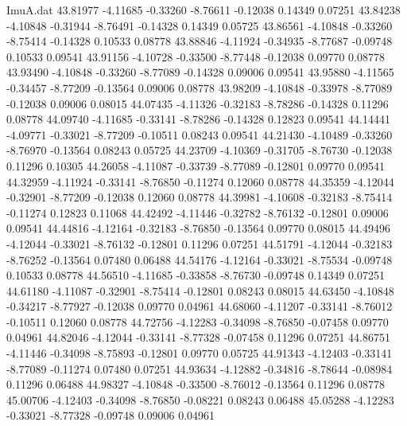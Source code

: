 \begin{filecontents}{ImuA.dat}
  43.81977   -4.11685   -0.33260   -8.76611   -0.12038    0.14349    0.07251
  43.84238   -4.10848   -0.31944   -8.76491   -0.14328    0.14349    0.05725
  43.86561   -4.10848   -0.33260   -8.75414   -0.14328    0.10533    0.08778
  43.88846   -4.11924   -0.34935   -8.77687   -0.09748    0.10533    0.09541
  43.91156   -4.10728   -0.33500   -8.77448   -0.12038    0.09770    0.08778
  43.93490   -4.10848   -0.33260   -8.77089   -0.14328    0.09006    0.09541
  43.95880   -4.11565   -0.34457   -8.77209   -0.13564    0.09006    0.08778
  43.98209   -4.10848   -0.33978   -8.77089   -0.12038    0.09006    0.08015
  44.07435   -4.11326   -0.32183   -8.78286   -0.14328    0.11296    0.08778
  44.09740   -4.11685   -0.33141   -8.78286   -0.14328    0.12823    0.09541
  44.14441   -4.09771   -0.33021   -8.77209   -0.10511    0.08243    0.09541
  44.21430   -4.10489   -0.33260   -8.76970   -0.13564    0.08243    0.05725
  44.23709   -4.10369   -0.31705   -8.76730   -0.12038    0.11296    0.10305
  44.26058   -4.11087   -0.33739   -8.77089   -0.12801    0.09770    0.09541
  44.32959   -4.11924   -0.33141   -8.76850   -0.11274    0.12060    0.08778
  44.35359   -4.12044   -0.32901   -8.77209   -0.12038    0.12060    0.08778
  44.39981   -4.10608   -0.32183   -8.75414   -0.11274    0.12823    0.11068
  44.42492   -4.11446   -0.32782   -8.76132   -0.12801    0.09006    0.09541
  44.44816   -4.12164   -0.32183   -8.76850   -0.13564    0.09770    0.08015
  44.49496   -4.12044   -0.33021   -8.76132   -0.12801    0.11296    0.07251
  44.51791   -4.12044   -0.32183   -8.76252   -0.13564    0.07480    0.06488
  44.54176   -4.12164   -0.33021   -8.75534   -0.09748    0.10533    0.08778
  44.56510   -4.11685   -0.33858   -8.76730   -0.09748    0.14349    0.07251
  44.61180   -4.11087   -0.32901   -8.75414   -0.12801    0.08243    0.08015
  44.63450   -4.10848   -0.34217   -8.77927   -0.12038    0.09770    0.04961
  44.68060   -4.11207   -0.33141   -8.76012   -0.10511    0.12060    0.08778
  44.72756   -4.12283   -0.34098   -8.76850   -0.07458    0.09770    0.04961
  44.82046   -4.12044   -0.33141   -8.77328   -0.07458    0.11296    0.07251
  44.86751   -4.11446   -0.34098   -8.75893   -0.12801    0.09770    0.05725
  44.91343   -4.12403   -0.33141   -8.77089   -0.11274    0.07480    0.07251
  44.93634   -4.12882   -0.34816   -8.78644   -0.08984    0.11296    0.06488
  44.98327   -4.10848   -0.33500   -8.76012   -0.13564    0.11296    0.08778
  45.00706   -4.12403   -0.34098   -8.76850   -0.08221    0.08243    0.06488
  45.05288   -4.12283   -0.33021   -8.77328   -0.09748    0.09006    0.04961

\end{filecontents}
